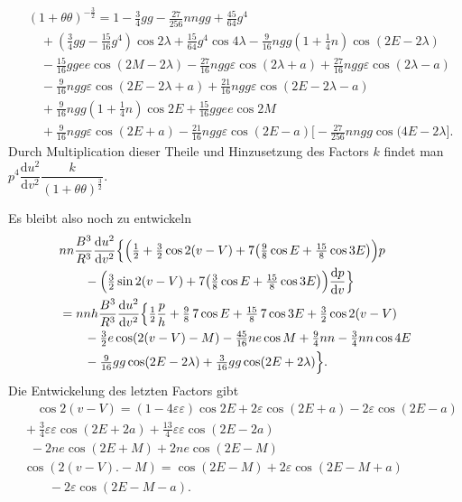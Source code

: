 \clearpage
\begingroup
{}
\renewcommand{\headrulewidth}{0pt}
\[
\begin{aligned}
&(1+\theta\theta)^{-\frac32}
 =1-\tfrac34gg-\tfrac{27}{256}nngg+\tfrac{45}{64}g^4\\
&\quad{}+(\tfrac34gg-\tfrac{15}{16}g^4)\cos2\lambda
 +\tfrac{15}{64}g^4\cos4\lambda
 -\tfrac{9}{16}ngg(1+\tfrac14n)\cos(2E-2\lambda)\\
&\quad{}-\tfrac{15}{16}ggee\cos(2M-2\lambda)
 -\tfrac{27}{16}ngg\varepsilon\cos(2\lambda+a)
 +\tfrac{27}{16}ngg\varepsilon\cos(2\lambda-a)\\
&\quad{}-\tfrac{9}{16}ngg\varepsilon\cos(2E-2\lambda+a)
 +\tfrac{21}{16}ngg\varepsilon\cos(2E-2\lambda-a)\\
&\quad{}+\tfrac{9}{16}ngg(1+\tfrac14n)\cos2E
 +\tfrac{15}{16}ggee\cos2M\\
&\quad{}+\tfrac{9}{16}ngg\varepsilon\cos(2E+a)
 -\tfrac{21}{16}ngg\varepsilon\cos(2E-a)
 \bigl[-\tfrac{27}{256}nngg\cos(4E-2\lambda\bigr].
\end{aligned}
\]
\noindent Durch Multiplication dieser Theile und Hinzusetzung des Factors \(k\) findet
man \(p^4\dfrac{\mathrm du^2}{\mathrm dv^2}\dfrac{k}{(1+\theta\theta)^{\frac32}}\).
\par\noindent\hspace*{\parindent}Es bleibt also noch zu entwickeln
\[
\begin{aligned}
&nn\frac{B^3}{R^3}\frac{\mathrm du^2}{\mathrm dv^2}
 \Bigl\{\Bigl(\tfrac12+\tfrac32\cos2(v-V)
 +7\bigl(\tfrac98\cos E+\tfrac{15}{8}\cos3E\bigr)\Bigr)p\\
&\qquad-\Bigl(\tfrac32\sin2(v-V)
 +7\bigl(\tfrac38\cos E+\tfrac{15}{8}\cos3E\bigr)\Bigr)
 \frac{\mathrm dp}{\mathrm dv}\Bigr\}\\
&=nnh\frac{B^3}{R^3}\frac{\mathrm du^2}{\mathrm dv^2}
 \Bigl\{\tfrac12\frac{p}{h}+\tfrac98\,7\cos E+\tfrac{15}{8}\,7\cos3E
 +\tfrac32\cos2(v-V)\\
&\qquad-\tfrac32e\cos(2(v-V)-M)-\tfrac{45}{16}ne\cos M
 +\tfrac94nn-\tfrac34nn\cos4E\\
&\qquad-\tfrac{9}{16}gg\cos(2E-2\lambda)
 +\tfrac{3}{16}gg\cos(2E+2\lambda)\Bigr\}.
\end{aligned}
\]
\noindent Die Entwickelung des letzten Factors gibt
\[
\begin{aligned}
&\quad\cos2(v-V)=(1-4\varepsilon\varepsilon)\cos2E
 +2\varepsilon\cos(2E+a)-2\varepsilon\cos(2E-a)\\
&{}+\tfrac34\varepsilon\varepsilon\cos(2E+2a)
 +\tfrac{13}{4}\varepsilon\varepsilon\cos(2E-2a)\\
&\enspace{}-2ne\cos(2E+M)+2ne\cos(2E-M)\\
&\cos(2(v-V)\mathord{.}-M)=\cos(2E-M)
 +2\varepsilon\cos(2E-M+a)\\
&\qquad{}-2\varepsilon\cos(2E-M-a).
\end{aligned}
\]
